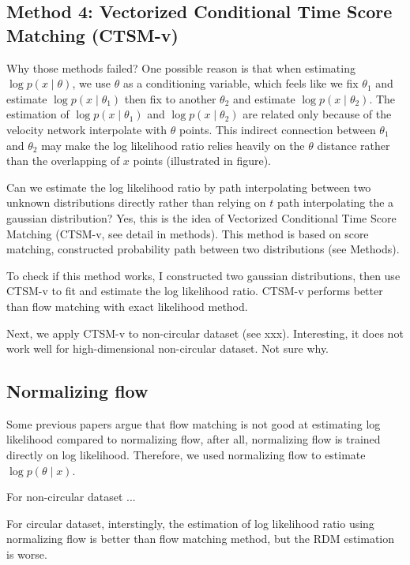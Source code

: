 \subsection{Method 4: Vectorized Conditional Time Score Matching (CTSM-v)}
Why those methods failed? One possible reason is that when estimating $\log p(x \mid \theta)$, we use $\theta$ as a conditioning variable, which feels like we fix $\theta_1$ and estimate $\log p(x \mid \theta_1)$ then fix to another $\theta_2$ and estimate $\log p(x \mid \theta_2)$. The estimation of $\log p(x \mid \theta_1)$ and $\log p(x \mid \theta_2)$ are related only because of the velocity network interpolate with $\theta$ points. This indirect connection between $\theta_1$ and $\theta_2$ may make the log likelihood ratio relies heavily on the $\theta$ distance rather than the overlapping of $x$ points (illustrated in figure).

Can we estimate the log likelihood ratio by path interpolating between two unknown distributions directly rather than relying on $t$ path interpolating the a gaussian distribution? Yes, this is the idea of Vectorized Conditional Time Score Matching (CTSM-v, see detail in methods). This method is based on score matching, constructed probability path between two distributions (see Methods). 

To check if this method works, I constructed two gaussian distributions, then use CTSM-v to fit and estimate the log likelihood ratio. CTSM-v performs better than flow matching with exact likelihood method.

Next, we apply CTSM-v to non-circular dataset (see xxx). Interesting, it does not work well for high-dimensional non-circular dataset. Not sure why.

\subsection{Normalizing flow}
Some previous papers argue that flow matching is not good at estimating log likelihood compared to normalizing flow, after all, normalizing flow is trained directly on log likelihood. Therefore, we used normalizing flow to estimate $\log p(\theta \mid x)$.

For non-circular dataset ...

For circular dataset, interstingly, the estimation of log likelihood ratio using normalizing flow is better than flow matching method, but the RDM estimation is worse.

